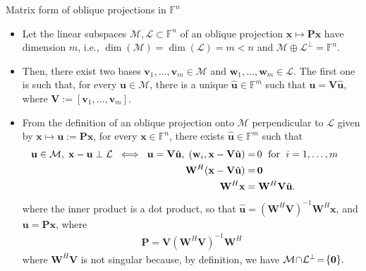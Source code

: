\documentclass[t,usepdftitle=false]{beamer}
\begin{document}
\begin{frame}{Matrix form of oblique projections in $\mathbb{F}^n$}
\begin{itemize}
\item Let the linear subspaces $\mathcal{M},\mathcal{L}\subset\mathbb{F}^n$ of an oblique projection $\mathbf{x}\mapsto\mathbf{P}\mathbf{x}$ have dimension $m$, i.e., $\dim(\mathcal{M})=\dim(\mathcal{L})=m<n$ and $\mathcal{M}\oplus\mathcal{L}^\perp=\mathbb{F}^n$.
\item Then, there exist two bases $\mathbf{v}_1,\dots,\mathbf{v}_m\in\mathcal{M}$ 
and  $\mathbf{w}_1,\dots,\mathbf{w}_m\in\mathcal{L}$.
The first one is such that, for every $\mathbf{u}\in\mathcal{M}$, there is a unique $\hat{\mathbf{u}}\in\mathbb{F}^m$ such that $\mathbf{u}=\mathbf{V}\hat{\mathbf{u}}$, where $\mathbf{V}:=[\mathbf{v}_1,\dots,\mathbf{v}_m]$.
\item From the definition of an oblique projection onto $\mathcal{M}$ perpendicular to $\mathcal{L}$ given by $\mathbf{x}\mapsto\mathbf{u}:=\mathbf{P}\mathbf{x}$, for every $\mathbf{x}\in\mathbb{F}^n$, there exists $\hat{\mathbf{u}}\in\mathbb{F}^m$ such that\vspace{-.1cm}
\begin{align*}
\hspace{-.5cm}
\mathbf{u}\in\mathcal{M},\;\mathbf{x}-\mathbf{u}\perp\mathcal{L}
\;\iff\;
\mathbf{u}=\mathbf{V}\hat{\mathbf{u}},\;
(\mathbf{w}_i,\mathbf{x}-\mathbf{V}\hat{\mathbf{u}})=&\,0\;\text{ for }\;i=1,\dots,m\\
\mathbf{W}^H(\mathbf{x}-\mathbf{V}\hat{\mathbf{u}})=&\,\mathbf{0}\\
\mathbf{W}^H\mathbf{x}=&\;\mathbf{W}^H\mathbf{V}\hat{\mathbf{u}}.
\end{align*}
where the inner product is a dot product, so that $\hat{\mathbf{u}}=(\mathbf{W}^H\mathbf{V})^{-1}\mathbf{W}^H\mathbf{x}$, and $\mathbf{u}=\mathbf{P}\mathbf{x}$, where\vspace{-.12cm}
\begin{align*}
\boxed{\mathbf{P}=\mathbf{V}(\mathbf{W}^H\mathbf{V})^{-1}\mathbf{W}^H}
\end{align*}
where $\mathbf{W}^H\mathbf{V}$ is not singular because, by definition, we have $\mathcal{M}\!\cap\!\mathcal{L}^\perp\!=\!\{\mathbf{0}\}.\hspace{-1cm}$
\end{itemize}
\end{frame}
\end{document}
